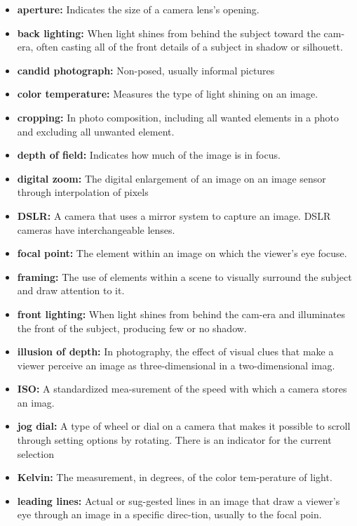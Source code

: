 \documentclass{report}
\begin{document}
    \bigbreak \noindent 
    \begin{itemize}
        \item \textbf{aperture:} Indicates the size of a camera lens’s opening. 
        \item \textbf{back lighting:} When light shines from behind the subject toward the cam-era, often casting all of the front details of a subject in shadow or silhouett.
        \item \textbf{candid photograph:} Non-posed, usually informal pictures
        \item \textbf{color temperature:} Measures the type of light shining on an image.
        \item \textbf{cropping:} In photo composition, including all wanted elements in a photo and excluding all unwanted element.
        \item \textbf{depth of field:} Indicates how much of the image is in focus.
        \item \textbf{digital zoom:} The digital enlargement of an image on an image sensor through interpolation of pixels
        \item \textbf{DSLR:} A camera that uses a mirror system to capture an image. DSLR cameras have interchangeable lenses.
        \item \textbf{focal point:} The element within an image on which the viewer’s eye focuse.
        \item \textbf{framing:} The use of elements within a scene to visually surround the subject and draw attention to it.
        \item \textbf{front lighting:} When light shines from behind the cam-era and illuminates the front of the subject, producing few or no shadow.
        \item \textbf{illusion of depth:} In photography, the effect of visual clues that make a viewer perceive an image as three-dimensional in a two-dimensional imag.
        \item \textbf{ISO:} A standardized mea-surement of the speed with which a camera stores an imag.
        \item \textbf{jog dial:} A type of wheel or dial on  a camera that makes it possible to scroll through setting options by rotating. There is an indicator for the current selection
        \item \textbf{Kelvin:} The measurement, in degrees, of the color tem-perature of light.
        \item \textbf{leading lines:} Actual or sug-gested lines in an image that draw a viewer’s eye through an image in a specific direc-tion, usually to the focal poin.

\end{itemize}
\end{document}
